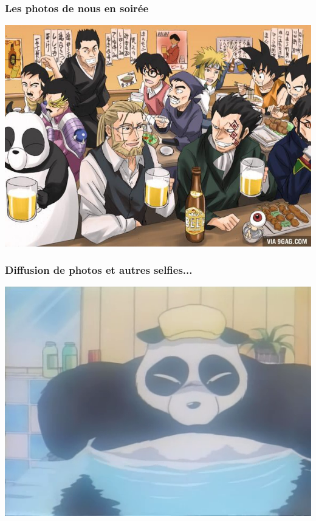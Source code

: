 \documentclass{beamer}
\begin{document}
\begin{frame}
\frametitle{Les photos de nous en soirée}
\begin{center}
\includegraphics[scale=0.5] {./images/Leak01.jpg} 
\end{center}
\end{frame}

\begin{frame}
\frametitle{Diffusion de photos et autres selfies...}
\begin{center}
\includegraphics[scale=0.5] {./images/Leak02.png} 
\end{center}
\end{frame}
\end{document}
